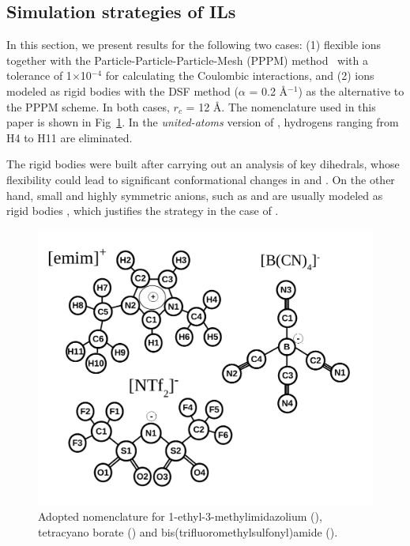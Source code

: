 \documentclass[3p,twocolumn]{elsarticle}
\begin{document}
\subsection{Simulation strategies of ILs}
\label{sec:prel_results}

In this section, we present results for the following two cases: (1) flexible ions together with the Particle-Particle-Particle-Mesh (PPPM) method~\cite{Hockney_1988} with a tolerance of 1$\times$10$^{-4}$ for calculating the Coulombic interactions, and (2) ions modeled as rigid bodies with the DSF method \cite{Fennell2006} ($\alpha$ = 0.2 {\AA}$^{-1}$) as the alternative to the PPPM scheme.
In both cases, $r_c$ = 12 {\AA}.
The nomenclature used in this paper is shown in Fig~\ref{fig:atoms_id}.
In the \textit{united-atoms} version of \ce{[emim]^+}, hydrogens ranging from H4 to H11 are eliminated.

The rigid bodies were built after carrying out an analysis of key dihedrals, whose flexibility could lead to significant conformational changes in \ce{[emim]^+} and \ce{[NTf_2]^-}.
On the other hand, small and highly symmetric anions, such as  and  are usually modeled as rigid bodies \cite{HANKE_2001,Hanke_2003,Lynden_Bell_2006}, which justifies the strategy in the case of \ce{[B(CN)_4]^-}.

\begin{figure}[ht]
\centering
\includegraphics[width=\linewidth]{atoms_id.pdf}
\caption{Adopted nomenclature for 1-ethyl-3-methylimidazolium  (\ce{[emim]^+}), tetracyano borate (\ce{[B(CN)_4]^-}) and bis(trifluoromethylsulfonyl)amide (\ce{[NTf_2]^-}).}
\label{fig:atoms_id}
\end{figure}
\end{document}
